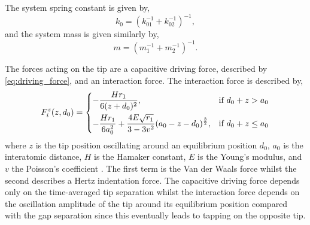 \documentclass{article}
\begin{document}
The system spring constant is given by,
\begin{equation}
	k_0 = \left( k_{01}^{-1} + k_{02}^{-1} \right)^{-1},
\end{equation}
and the system mass is given similarly by,
\begin{equation}
	m = \left( m_1^{-1} + m_2^{-1} \right)^{-1}.
\end{equation}

The forces acting on the tip are a capacitive driving force, described by \eqref{eq:driving_force}, and an interaction force. The interaction force is described by,
\begin{equation}
	F_i^z(z, d_0) =
	\begin{dcases}
	-\frac{H r_1}{6(z+d_0)^2}, & \text{if } d_0 + z > a_0 \\
	-\frac{H r_1}{6a_0^2} + \frac{4E\sqrt{r_1}}{3 - 3v^2} (a_0-z-d_0)^{\frac{3}{2}}, & \text{if } d_0 + z \leq a_0
	\end{dcases}
	\label{eq:tapping_force}
\end{equation}
where $z$ is the tip position oscillating around an equilibrium position $d_0$, $a_0$ is the interatomic distance, $H$ is the Hamaker constant, $E$ is the Young's modulus, and $v$ the Poisson's coefficient \cite{tamayo1996deformation, garcia1999attractive, san2002unifying, lee2002nonlinear}. The first term is the Van der Waals force whilst the second describes a Hertz indentation force. The capacitive driving force depends only on the time-averaged tip separation whilst the interaction force depends on the oscillation amplitude of the tip around its equilibrium position compared with the gap separation since this eventually leads to tapping on the opposite tip.
\end{document}
